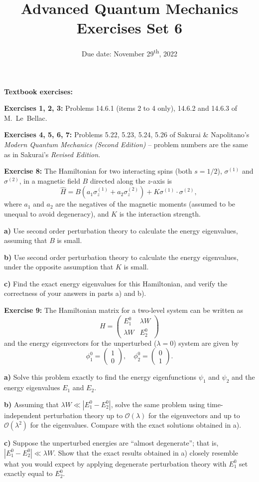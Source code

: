 \documentclass[12pt]{article}
\title{Advanced Quantum Mechanics\\Exercises Set 6\vspace{-1em}}
\date{Due date: November 29\textsuperscript{th}, 2022}
\begin{document}
\maketitle

\textbf{Textbook exercises:}

\textbf{Exercises 1, 2, 3:} Problems 14.6.1 (items 2 to 4 only), 14.6.2 and 14.6.3 of M.~Le~Bellac.

\textbf{Exercises 4, 5, 6, 7:} Problems 5.22, 5.23, 5.24, 5.26 of Sakurai \& Napolitano's \emph{Modern Quantum Mechanics (Second Edition)} -- problem numbers are the same as in Sakurai's \emph{Revised Edition}.

\textbf{Exercise 8:} The Hamiltonian for two interacting spins
(both $s=1 / 2$), $\sigma^{(1)}$ and $\sigma^{(2)}$, in a magnetic field $B$ directed along the $z$-axis is
\[
\hat{H}=B\left(a_{1} \sigma_{z}^{(1)}+a_{2} \sigma_{z}^{(2)}\right)+K \sigma^{(1)} \cdot \sigma^{(2)} \text {, }
\]
where $a_{1}$ and $a_{2}$ are the negatives of the magnetic moments (assumed to be unequal to avoid
degeneracy), and $K$ is the interaction strength.

\textbf{a)} Use second order perturbation theory to calculate the energy eigenvalues, assuming that
$B$ is small.

\textbf{b)} Use second order perturbation theory to calculate the energy eigenvalues, under the opposite assumption that $K$ is small.

\textbf{c)} Find the exact energy eigenvalues for this Hamiltonian, and verify the correctness of your
answers in parts a) and b).

\textbf{Exercise 9:} The Hamiltonian matrix
for a two-level system can be written as
\[
H=\begin{pmatrix}E_{1}^{0} & \lambda W \\ \lambda W & E_{2}^{0}\end{pmatrix}
\]
and the energy eigenvectors for the unperturbed ($\lambda=0$) system are given by
\[
\phi_{1}^{0}=\begin{pmatrix}1 \\ 0\end{pmatrix}, \quad \phi_{2}^{0}=\begin{pmatrix}0 \\ 1\end{pmatrix}.
\]

\textbf{a)} Solve this problem exactly to find the energy eigenfunctions $\psi_{1}$ and $\psi_{2}$ and the energy
eigenvalues $E_{1}$ and $E_{2}$.

\textbf{b)} Assuming that $\lambda W \ll\left|E_{1}^{0}-E_{2}^{0}\right|$, solve the same problem using time-independent perturbation theory up to $\mathcal{O}(\lambda)$ for the eigenvectors and up to $\mathcal{O}\left(\lambda^{2}\right)$ for the eigenvalues. Compare
with the exact solutions obtained in a).

\textbf{c)} Suppose the unperturbed energies are ``almost degenerate''; that is, $\left|E_{1}^{0}-E_{2}^{0}\right| \ll \lambda W$. Show
that the exact results obtained in a) closely resemble what you would expect by applying
degenerate perturbation theory with $E_{1}^{0}$ set exactly equal to $E_{2}^{0}$.
\end{document}
